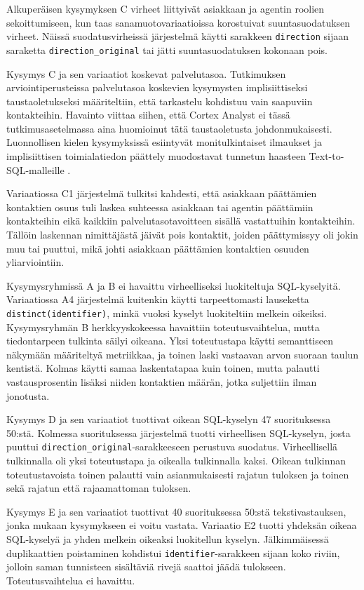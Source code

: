 Alkuperäisen kysymyksen C
virheet liittyivät asiakkaan ja agentin roolien
sekoittumiseen, kun taas sanamuotovariaatioissa korostuivat
suuntasuodatuksen virheet. Näissä suodatusvirheissä
järjestelmä käytti sarakkeen \texttt{direction} sijaan
saraketta \texttt{direction\_original} tai jätti
suuntasuodatuksen kokonaan pois.

Kysymys C ja sen variaatiot koskevat palvelutasoa. Tutkimuksen
arviointiperusteissa palvelutasoa koskevien kysymysten implisiittiseksi
taustaoletukseksi määriteltiin, että tarkastelu kohdistuu vain
saapuviin kontakteihin. Havainto viittaa siihen, että Cortex Analyst
ei tässä tutkimusasetelmassa aina huomioinut tätä taustaoletusta
johdonmukaisesti. Luonnollisen kielen kysymyksissä esiintyvät
monitulkintaiset ilmaukset ja implisiittisen toimialatiedon päättely
muodostavat tunnetun haasteen Text-to-SQL-malleille
\cite{deng2021spiderrealistic,chang2023drspider}.

Variaatiossa C1 järjestelmä tulkitsi kahdesti, että asiakkaan päättämien kontaktien osuus tuli laskea suhteessa asiakkaan tai agentin päättämiin kontakteihin eikä kaikkiin palvelutasotavoitteen sisällä vastattuihin kontakteihin. Tällöin laskennan nimittäjästä jäivät pois kontaktit, joiden päättymissyy oli jokin muu tai puuttui, mikä johti asiakkaan päättämien kontaktien osuuden yliarviointiin.

Kysymysryhmissä A ja B ei havaittu virheelliseksi luokiteltuja
SQL-kyselyitä. Variaatiossa A4 järjestelmä kuitenkin käytti
tarpeettomasti lauseketta \\ \texttt{distinct(identifier)}, minkä vuoksi
kyselyt luokiteltiin melkein oikeiksi. Kysymysryhmän B
herkkyyskokeessa havaittiin toteutusvaihtelua, mutta tiedontarpeen
tulkinta säilyi oikeana. Yksi toteutustapa käytti semanttiseen näkymään määriteltyä metriikkaa, ja toinen laski vastaavan arvon suoraan taulun kentistä. Kolmas käytti samaa laskentatapaa kuin toinen, mutta palautti vastausprosentin lisäksi niiden kontaktien määrän, jotka suljettiin ilman jonotusta.

Kysymys D ja sen variaatiot tuottivat oikean SQL-kyselyn
47 suorituksessa 50:stä. Kolmessa suorituksessa järjestelmä tuotti
virheellisen SQL-kyselyn, josta puuttui
\texttt{direction\_original}-sarakkeeseen perustuva suodatus.
Virheellisellä tulkinnalla oli yksi toteutustapa ja oikealla
tulkinnalla kaksi. Oikean tulkinnan toteutustavoista toinen palautti
vain asianmukaisesti rajatun tuloksen ja toinen sekä rajatun että
rajaamattoman tuloksen.

Kysymys E ja sen variaatiot tuottivat 40 suorituksessa 50:stä
tekstivastauksen, jonka mukaan kysymykseen ei voitu vastata.
Variaatio E2 tuotti yhdeksän oikeaa SQL-kyselyä ja yhden melkein
oikeaksi luokitellun kyselyn. Jälkimmäisessä duplikaattien poistaminen
kohdistui \texttt{identifier}-sarakkeen sijaan koko riviin, jolloin
saman tunnisteen sisältäviä rivejä saattoi jäädä tulokseen.
Toteutusvaihtelua ei havaittu.

